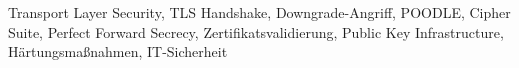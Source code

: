 \documentclass[conference]{IEEEtran}
\begin{document}
\begin{IEEEkeywords}
Transport Layer Security, TLS Handshake, Downgrade-Angriff,
POODLE, Cipher Suite, Perfect Forward Secrecy, Zertifikatsvalidierung,
Public Key Infrastructure, Härtungsmaßnahmen, IT-Sicherheit
\end{IEEEkeywords}







\end{document}
